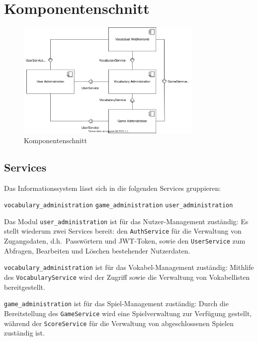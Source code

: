 \section{Komponentenschnitt}\label{sec:komponentenschnitt}

\begin{figure}[H]
    \centering
    \includegraphics[width=0.8\textwidth]{components_diagram}
    \caption[]{Komponentenschnitt}
    \label{fig:komponenten-1}
\end{figure}

\subsection{Services}

Das Informationssystem lässt sich in die folgenden Services gruppieren:

\begin{outline}
    \1 \texttt{vocabulary\_administration}
    \1 \texttt{game\_administration}
    \1 \texttt{user\_administration}
\end{outline}

Das Modul \texttt{user\_administration} ist für das Nutzer-Management zuständig:
Es stellt wiederum zwei Services bereit: den \texttt{AuthService} für die Verwaltung von Zugangsdaten,
d.h.\ Passwörtern und JWT-Token, sowie den \texttt{UserService} zum Abfragen, Bearbeiten und Löschen
bestehender Nutzerdaten.

\texttt{vocabulary\_administration} ist für das Vokabel-Management zuständig:
Mithlife des \texttt{VocabularyService} wird der Zugriff sowie die Verwaltung von Vokabellisten bereitgestellt.

\texttt{game\_administration} ist für das Spiel-Management zuständig:
Durch die Bereitstellung des \texttt{GameService} wird eine Spielverwaltung zur Verfügung gestellt,
während der \texttt{ScoreService} für die Verwaltung von abgeschlossenen Spielen zuständig ist.

